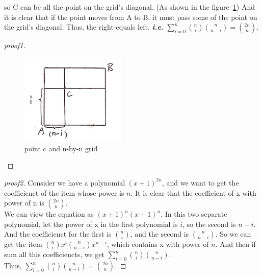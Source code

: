 \documentclass{article}
\begin{document}
\begin{enumerate}
\begin{enumerate}
                so C can be all the point on the grid's diagonal. (As shown in the figure~\ref{fig:Drawing})
                And it is clear that if the point moves from A to B, it must pass some of the point on the grid's diagonal. Thus, the right equals left.
                \textbf{\textit{i.e.}} $\sum_{i = 0}^n \binom{n}{i} \binom{n}{n - i} = \binom{2n}{n}$.
                \begin{proof}[proof1]
                    \begin{figure}
                        \includegraphics[width=2in]{Drawing}
                        \centering
                        \caption{point c and n-by-n grid}
                        \label{fig:Drawing}
                    \end{figure}
            \end{proof}

            \begin{proof}[proof2]
                Consider we have a polynomial $(x + 1) ^ {2n}$,
                and we want to get the coefficienct of the item whose power is $n$. It is clear that the coefficient of x with power of n is $\binom{2n}{n}$.\\
                We can view the equation as $(x + 1) ^ n (x + 1) ^n $.
                In this two separate polynomial, let the power of x in the first polynomial is $i$, so the second is $n - i$.
                And the coefficienct for the first is $\binom{n}{i}$, and the second is $\binom{n}{n - i}$.
                So we can get the item $\binom{n}{i}x^i \binom{n}{n - i}x^{n - i}$, which contains x with power of $n$.
                And then if sum all this coefficiencts, we get $\sum_{i = 0}^n \binom{n}{i} \binom{n}{n - i}$.\\
                Thus, $\sum_{i = 0}^n \binom{n}{i} \binom{n}{n - i} = \binom{2n}{n}$. 
            \end{proof}
        \end{enumerate}
        
    \end{enumerate}
\end{document}

